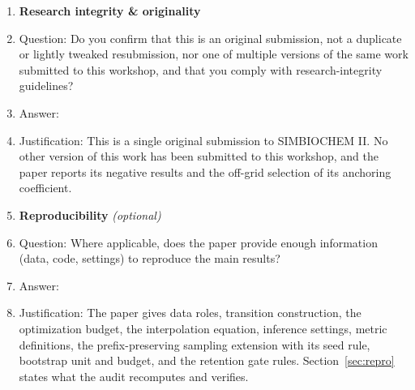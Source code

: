 \begin{enumerate}
\item {\bf Research integrity \& originality}
    \item[] Question: Do you confirm that this is an original submission, not a duplicate or lightly tweaked resubmission, nor one of multiple versions of the same work submitted to this workshop, and that you comply with research-integrity guidelines?
    \item[] Answer: \answerYes{}
    \item[] Justification: This is a single original submission to SIMBIOCHEM II. No other version of this work has been submitted to this workshop, and the paper reports its negative results and the off-grid selection of its anchoring coefficient.

\item {\bf Reproducibility} \emph{(optional)}
    \item[] Question: Where applicable, does the paper provide enough information (data, code, settings) to reproduce the main results?
    \item[] Answer: \answerYes{}
    \item[] Justification: The paper gives data roles, transition construction, the optimization budget, the interpolation equation, inference settings, metric definitions, the prefix-preserving sampling extension with its seed rule, bootstrap unit and budget, and the retention gate rules. Section~\ref{sec:repro} states what the audit recomputes and verifies.

\end{enumerate}
